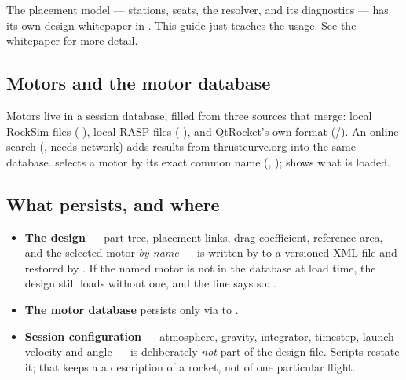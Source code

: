 \begin{note}
The placement model --- stations, seats, the resolver, and its diagnostics ---
has its own design whitepaper in
. This guide just teaches the usage.
See the whitepaper for more detail.
\end{note}

\subsection{Motors and the motor database}\label{sec:motors-concept}

Motors live in a session database, filled from three sources that merge: local
RockSim files ( ), local RASP files
( ), and QtRocket's own  format
(/). An online search
(, needs network) adds results from
\href{https://www.thrustcurve.org}{thrustcurve.org} into the same database.
 selects a motor by its exact common name (,
);  shows what is loaded.

\subsection{What persists, and where}\label{sec:persistence}

\begin{itemize}
\item \textbf{The design} --- part tree, placement links, drag coefficient,
      reference area, and the selected motor \emph{by name} --- is written by
       to a versioned  XML file and restored by
      . If the named motor is not in the database at load
      time, the design still loads without one, and the \ok{} line says so:
      .
\item \textbf{The motor database} persists only via  to
      .
\item \textbf{Session configuration} --- atmosphere, gravity, integrator,
      timestep, launch velocity and angle --- is deliberately \emph{not} part
      of the design file. Scripts restate it; that keeps a 
      a description of a rocket, not of one particular flight.
\end{itemize}
